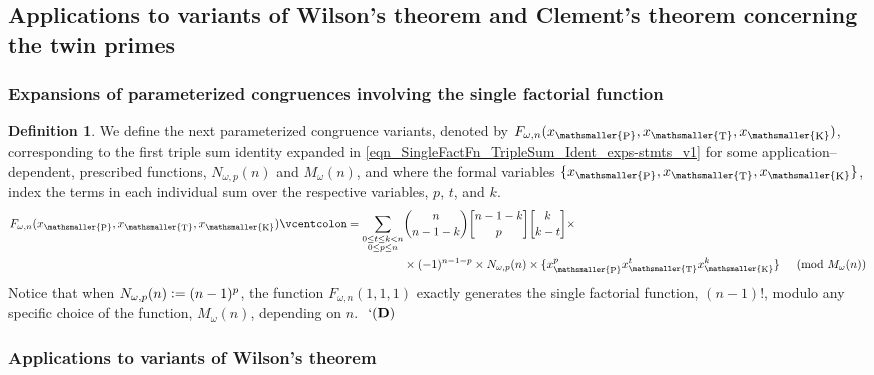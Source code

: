 \documentclass[12pt,reqno]{article}
\numberwithin{sfootnote}{section}
\numberwithin{equation}{section}
\theoremstyle{DefaultTheoremStyle}
\theoremstyle{definition}
\newtheorem{definition}[theorem]{Definition}
\newcommand{\eolqedsymbol}[1]{{\hrulefill\ensuremath{\ #1}}}
\renewcommand{\eolqedsymbol}[1]{{\mboxfill{ }\ensuremath{\ #1}}}
\newcommand{\DefinitionQEDSymbol}{`(\text{\rm{\bf D}})}
\newcommand{\DefinitionQED}{\eolqedsymbol{\DefinitionQEDSymbol}}
\newcommand{\defequals}{\ensuremath{\vcentcolon=}}
\newcommand{\gkpSI}[2]{\ensuremath{\genfrac{\lbrack}{\rbrack}{0pt}{}{#1}{#2}}}
\DeclareMathOperator{\XT}{T}
\DeclareMathOperator{\XK}{K}
\DeclareMathOperator{\XP}{P}
\newcommand{\xt}{x_{\mathsmaller{\XT}}}
\newcommand{\xk}{x_{\mathsmaller{\XK}}}
\newcommand{\xp}{x_{\mathsmaller{\XP}}}
\begin{document}
\subsection{Applications to 
            variants of Wilson's theorem and 
            Clement's theorem concerning the twin primes} 
\label{subsubSection_NewIdentsFromFiniteDiffEqns_ExpsOfPrime-RelatedCongr} 

\subsubsection{Expansions of parameterized congruences 
               involving the single factorial function} 

\begin{definition} 
\label{def_v2} 
We define the next parameterized congruence variants, 
denoted by $F_{\omega,n}(\xp, \xt, \xk)$, 
corresponding to the first triple sum identity expanded in 
\eqref{eqn_SingleFactFn_TripleSum_Ident_exps-stmts_v1} 
for some application--dependent, prescribed functions, 
$N_{\omega,p}(n)$ and $M_{\omega}(n)$, and where the formal variables 
$\{\xp, \xt, \xk\}$, index the terms in each 
individual sum over the respective variables, $p$, $t$, and $k$. 
\begin{align} 
\label{eqn_FwnXpXtXk_RHS_CongruenceFn_def-stmt_v1} 
F_{\omega,n}(\xp, \xt, \xk) \defequals 
     \sum\limits_{\substack{0 \leq t \leq k < n \\ 0 \leq p \leq n}} & 
     \binom{n}{n-1-k} \gkpSI{n-1-k}{p} \gkpSI{k}{k-t} \times && \\ 
\notag 
     & \times 
     (-1)^{n-1-p} \times N_{\omega,p}(n) 
     \times \{\xp^p \xt^t \xk^k\} 
     && \pmod{M_{\omega}(n)} 
\end{align} 
Notice that 
when $N_{\omega,p}(n) \defequals (n-1)^{p}$, the function 
$F_{\omega,n}(1, 1, 1)$ exactly generates the 
single factorial function, $(n-1)!$, modulo any specific choice of the 
function, $M_{\omega}(n)$, depending on $n$. 
\DefinitionQED 
\end{definition} 

\subsubsection{Applications 
               to variants of Wilson's theorem} 
\label{subsubSection_TripleSumIdents_App_to_WThm} 
\end{document}
